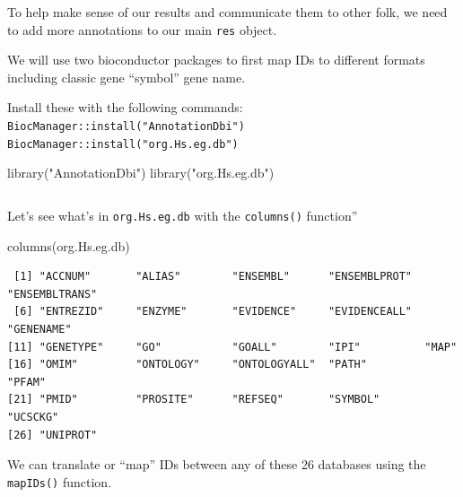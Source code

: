 \documentclass[
  letterpaper,
  DIV=11,
  numbers=noendperiod]{scrartcl}
\newenvironment{Shaded}{\begin{snugshade}}{\end{snugshade}}
\newcommand{\CommentTok}[1]{\textcolor[rgb]{0.37,0.37,0.37}{#1}}
\newcommand{\FunctionTok}[1]{\textcolor[rgb]{0.28,0.35,0.67}{#1}}
\newcommand{\NormalTok}[1]{\textcolor[rgb]{0.00,0.23,0.31}{#1}}
\newcommand{\StringTok}[1]{\textcolor[rgb]{0.13,0.47,0.30}{#1}}
\begin{document}
To help make sense of our results and communicate them to other folk, we
need to add more annotations to our main \texttt{res} object.

We will use two bioconductor packages to first map IDs to different
formats including classic gene ``symbol'' gene name.

Install these with the following commands:
\texttt{BiocManager::install("AnnotationDbi")}
\texttt{BiocManager::install("org.Hs.eg.db")}

\begin{Shaded}
\begin{Highlighting}[]
\FunctionTok{library}\NormalTok{(}\StringTok{"AnnotationDbi"}\NormalTok{)}
\FunctionTok{library}\NormalTok{(}\StringTok{"org.Hs.eg.db"}\NormalTok{)}
\end{Highlighting}
\end{Shaded}

\begin{verbatim}
\end{verbatim}

\begin{Shaded}
\end{Shaded}

Let's see what's in \texttt{org.Hs.eg.db} with the \texttt{columns()}
function''

\begin{Shaded}
\begin{Highlighting}[]
\FunctionTok{columns}\NormalTok{(org.Hs.eg.db)}
\end{Highlighting}
\end{Shaded}

\begin{verbatim}
 [1] "ACCNUM"       "ALIAS"        "ENSEMBL"      "ENSEMBLPROT"  "ENSEMBLTRANS"
 [6] "ENTREZID"     "ENZYME"       "EVIDENCE"     "EVIDENCEALL"  "GENENAME"    
[11] "GENETYPE"     "GO"           "GOALL"        "IPI"          "MAP"         
[16] "OMIM"         "ONTOLOGY"     "ONTOLOGYALL"  "PATH"         "PFAM"        
[21] "PMID"         "PROSITE"      "REFSEQ"       "SYMBOL"       "UCSCKG"      
[26] "UNIPROT"     
\end{verbatim}

We can translate or ``map'' IDs between any of these 26 databases using
the \texttt{mapIDs()} function.
\end{document}
